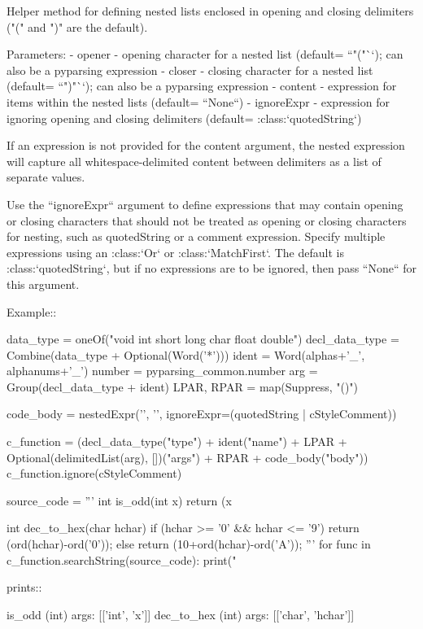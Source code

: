 \begin{DoxyVerb}Helper method for defining nested lists enclosed in opening and
closing delimiters ("(" and ")" are the default).

Parameters:
 - opener - opening character for a nested list
   (default= ``"("``); can also be a pyparsing expression
 - closer - closing character for a nested list
   (default= ``")"``); can also be a pyparsing expression
 - content - expression for items within the nested lists
   (default= ``None``)
 - ignoreExpr - expression for ignoring opening and closing
   delimiters (default= :class:`quotedString`)

If an expression is not provided for the content argument, the
nested expression will capture all whitespace-delimited content
between delimiters as a list of separate values.

Use the ``ignoreExpr`` argument to define expressions that may
contain opening or closing characters that should not be treated as
opening or closing characters for nesting, such as quotedString or
a comment expression.  Specify multiple expressions using an
:class:`Or` or :class:`MatchFirst`. The default is
:class:`quotedString`, but if no expressions are to be ignored, then
pass ``None`` for this argument.

Example::

    data_type = oneOf("void int short long char float double")
    decl_data_type = Combine(data_type + Optional(Word('*')))
    ident = Word(alphas+'_', alphanums+'_')
    number = pyparsing_common.number
    arg = Group(decl_data_type + ident)
    LPAR, RPAR = map(Suppress, "()")

    code_body = nestedExpr('{', '}', ignoreExpr=(quotedString | cStyleComment))

    c_function = (decl_data_type("type")
                  + ident("name")
                  + LPAR + Optional(delimitedList(arg), [])("args") + RPAR
                  + code_body("body"))
    c_function.ignore(cStyleComment)

    source_code = '''
        int is_odd(int x) {
            return (x%
        }

        int dec_to_hex(char hchar) {
            if (hchar >= '0' && hchar <= '9') {
                return (ord(hchar)-ord('0'));
            } else {
                return (10+ord(hchar)-ord('A'));
            }
        }
    '''
    for func in c_function.searchString(source_code):
        print("%


prints::

    is_odd (int) args: [['int', 'x']]
    dec_to_hex (int) args: [['char', 'hchar']]
\end{DoxyVerb}
 \mbox{\label{namespacepyparsing_a07c627d849577b15ab1b5da26df30982}} 
